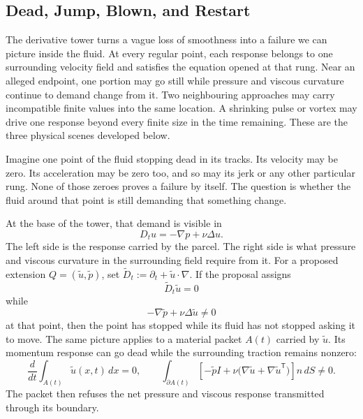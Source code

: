\subsection{Dead, Jump, Blown, and Restart}\label{sub:DeadJumpBlownAndRestart}

The derivative tower turns a vague loss of smoothness into a failure we can picture inside the fluid.
At every regular point, each response belongs to one surrounding velocity field and satisfies the equation opened at that rung.
Near an alleged endpoint, one portion may go still while pressure and viscous curvature continue to demand change from it.
Two neighbouring approaches may carry incompatible finite values into the same location.
A shrinking pulse or vortex may drive one response beyond every finite size in the time remaining.
These are the three physical scenes developed below.


Imagine one point of the fluid stopping dead in its tracks.
Its velocity may be zero.
Its acceleration may be zero too, and so may its jerk or any other particular rung.
None of those zeroes proves a failure by itself.
The question is whether the fluid around that point is still demanding that something change.

At the base of the tower, that demand is visible in
\[
  D_tu=-\nabla p+\nu\Delta u.
\]
The left side is the response carried by the parcel.
The right side is what pressure and viscous curvature in the surrounding field require from it.
For a proposed extension \(Q=(\widetilde u,\widetilde p)\), set \(\widetilde D_t:=\partial_t+\widetilde u\cdot\nabla\).
If the proposal assigns
\[
  \widetilde D_t\widetilde u=0
\]
while
\[
  -\nabla\widetilde p+\nu\Delta\widetilde u\neq0
\]
at that point, then the point has stopped while its fluid has not stopped asking it to move.
The same picture applies to a material packet \(A(t)\) carried by \(\widetilde u\).
Its momentum response can go dead while the surrounding traction remains nonzero:
\[
  \frac{d}{dt}
  \int_{A(t)}\widetilde u(x,t)\,dx
  =0,
  \qquad
  \int_{\partial A(t)}
  \left[
    -\widetilde pI
    +
    \nu\bigl(\nabla\widetilde u+\nabla\widetilde u^{\mathsf T}\bigr)
  \right]n\,dS
  \neq0.
\]
The packet then refuses the net pressure and viscous response transmitted through its boundary.

